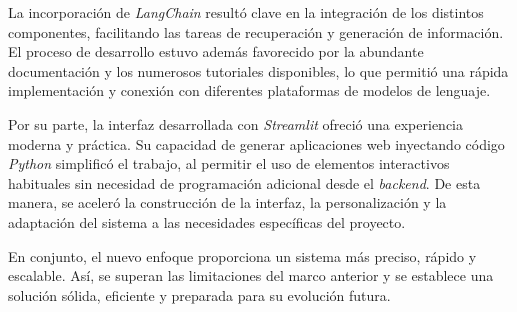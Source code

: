 		\noindent La incorporación de \textit{LangChain} resultó clave en la integración de los distintos componentes, facilitando las tareas de recuperación y generación de información. El proceso de desarrollo estuvo además favorecido por la abundante documentación y los numerosos tutoriales disponibles, lo que permitió una rápida implementación y conexión con diferentes plataformas de modelos de lenguaje.
		
		\noindent Por su parte, la interfaz desarrollada con \textit{Streamlit} ofreció una experiencia moderna y práctica. Su capacidad de generar aplicaciones web inyectando código \textit{Python} simplificó el trabajo, al permitir el uso de elementos interactivos habituales sin necesidad de programación adicional desde el \textit{backend}. De esta manera, se aceleró la construcción de la interfaz, la personalización y la adaptación del sistema a las necesidades específicas del proyecto.
		
		\noindent En conjunto, el nuevo enfoque proporciona un sistema más preciso, rápido y escalable. Así, se superan las limitaciones del marco anterior y se establece una solución sólida, eficiente y preparada para su evolución futura.

\endgroup
